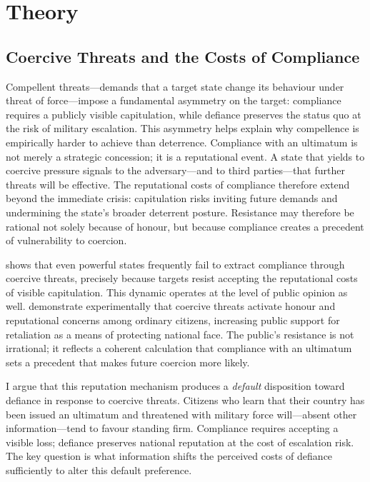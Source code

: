 \section{Theory}

\subsection{Coercive Threats and the Costs of Compliance}

Compellent threats---demands that a target state change its behaviour under threat of force---impose a fundamental asymmetry on the target: compliance requires a publicly visible capitulation, while defiance preserves the status quo at the risk of military escalation.\autocite{schelling_arms_1966} This asymmetry helps explain why compellence is empirically harder to achieve than deterrence.\autocite{schelling_arms_1966, sechser_goliaths_2010} Compliance with an ultimatum is not merely a strategic concession; it is a reputational event. A state that yields to coercive pressure signals to the adversary---and to third parties---that further threats will be effective. The reputational costs of compliance therefore extend beyond the immediate crisis: capitulation risks inviting future demands and undermining the state's broader deterrent posture.\autocite{fearon_domestic_1994, dafoe_coercion_2021} Resistance may therefore be rational not solely because of honour, but because compliance creates a precedent of vulnerability to coercion.

\textcite{sechser_goliaths_2010} shows that even powerful states frequently fail to extract compliance through coercive threats, precisely because targets resist accepting the reputational costs of visible capitulation. This dynamic operates at the level of public opinion as well. \textcite{dafoe_coercion_2021, dafoe_provocation_2022} demonstrate experimentally that coercive threats activate honour and reputational concerns among ordinary citizens, increasing public support for retaliation as a means of protecting national face. The public's resistance is not irrational; it reflects a coherent calculation that compliance with an ultimatum sets a precedent that makes future coercion more likely.

I argue that this reputation mechanism produces a \textit{default} disposition toward defiance in response to coercive threats. Citizens who learn that their country has been issued an ultimatum and threatened with military force will---absent other information---tend to favour standing firm. Compliance requires accepting a visible loss; defiance preserves national reputation at the cost of escalation risk. The key question is what information shifts the perceived costs of defiance sufficiently to alter this default preference.

